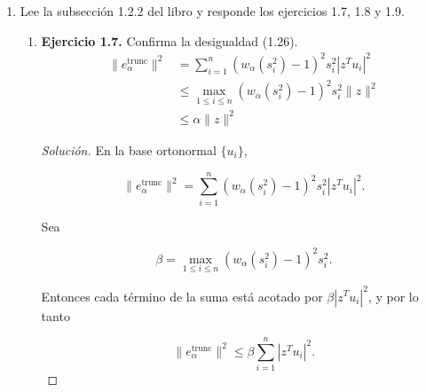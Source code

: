 \documentclass[12pt,spanish,mexico]{article}
\numberwithin{equation}{section}
\theoremstyle{definition}
\theoremstyle{remark}
\newenvironment{solution}{\begin{proof}[Solución]}{\end{proof}}
\begin{document}
\begin{enumerate}[label=(\alph*)]
\begin{enumerate}
\begin{solution}
\[
\left|
w_\alpha(s_i^2)s_i^{-1}
\right|
\le
\alpha^{-1/2}.
\]

Por lo tanto,

\[
\|e_\alpha^{\text{ruido}}\|^2
\le
\alpha^{-1}
\sum_{i=1}^{n}
(u_i^T \eta)^2.
\]

Como $\{u_i\}$ también es ortonormal,

\[
\sum_{i=1}^{n}
(u_i^T \eta)^2
=
\|\eta\|^2.
\]

Usando (1.5),

\[
\|\eta\| = \delta,
\]

Se obtiene

\[
\|e_\alpha^{\text{ruido}}\|^2
\le
\alpha^{-1}\delta^2.
\]

Aplicando raíz cuadrada,

\[
\|e_\alpha^{\text{ruido}}\|
\le
\alpha^{-1/2}\delta.
\]

Esto prueba (1.22).
        \end{solution}
    \end{enumerate}
    
    \item Lee la subsección 1.2.2 del libro y responde los ejercicios 1.7, 1.8 y 1.9.
    \begin{enumerate}
        \item \textbf{Ejercicio 1.7.} Confirma la desigualdad (1.26).
        \begin{equation}
            \begin{aligned}
                \|e_\alpha^{\text{trunc}}\|^2&=\sum_{i=1}^{n}(w_\alpha(s_i^2)-1)^2s_i^2|z^{T}u_i|^2 \\
                &\leq \max_{1 \leq i \leq n}(w_\alpha(s_i^2)-1)^2 s_i^2 \|z\|^2 \\
                &\leq \alpha \|z\|^2
            \end{aligned}
            \tag{1.26}
        \end{equation}
        \begin{solution}
        
En la base ortonormal $\{u_i\}$,

\[
\|e_\alpha^{\text{trunc}}\|^2
=
\sum_{i=1}^{n}
(w_\alpha(s_i^2)-1)^2
s_i^2
|z^{T}u_i|^2.
\]

Sea

\[
\beta
=
\max_{1\le i\le n}
(w_\alpha(s_i^2)-1)^2 s_i^2.
\]

Entonces cada término de la suma está acotado por $\beta|z^T u_i|^2$, y por lo tanto

\[
\|e_\alpha^{\text{trunc}}\|^2
\le
\beta
\sum_{i=1}^{n}
|z^{T}u_i|^2.
\]


\end{solution}
\end{enumerate}
\end{enumerate}
\end{document}
